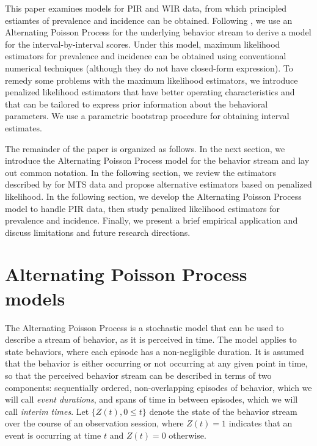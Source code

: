 \documentclass[man, noextraspace, floatsintext]{apa6}\usepackage[]{graphicx}\usepackage[]{color}
\begin{document}
This paper examines models for PIR and WIR data, from which principled estiamtes of prevalence and incidence can be obtained. Following \citet{Brown1977estimation}, we use an Alternating Poisson Process for the underlying behavior stream to derive a model for the interval-by-interval scores. Under this model, maximum likelihood estimators for prevalence and incidence can be obtained using conventional numerical techniques (although they do not have closed-form expression). To remedy some problems with the maximum likelihood estimators, we introduce penalized likelihood estimators that have better operating characteristics and that can be tailored to express prior information about the behavioral parameters. We use a parametric bootstrap procedure for obtaining interval estimates.


The remainder of the paper is organized as follows. In the next section, we introduce the Alternating Poisson Process model for the behavior stream and lay out common notation. In the following section, we review the estimators described by \citet{Brown1977estimation} for MTS data and propose alternative estimators based on penalized likelihood. In the following section, we develop the Alternating Poisson Process model to handle PIR data, then study penalized likelihood estimators for prevalence and incidence. Finally, we present a brief empirical application and discuss limitations and future research directions.

\section{Alternating Poisson Process models}
\label{sec:APP}

The Alternating Poisson Process is a stochastic model that can be used to describe a stream of behavior, as it is perceived in time. The model applies to state behaviors, where each episode has a non-negligible duration. It is assumed that the behavior is either occurring or not occurring at any given point in time, so that the perceived behavior stream can be described in terms of two components: sequentially ordered, non-overlapping episodes of behavior, which we will call \textit{event durations}, and spans of time in between episodes, which we will call \textit{interim times}. Let $\{Z(t), 0 \leq t\}$ denote the state of the behavior stream over the course of an observation session, where $Z(t) = 1$ indicates that an event is occurring at time $t$ and $Z(t) = 0$ otherwise.
\end{document}
